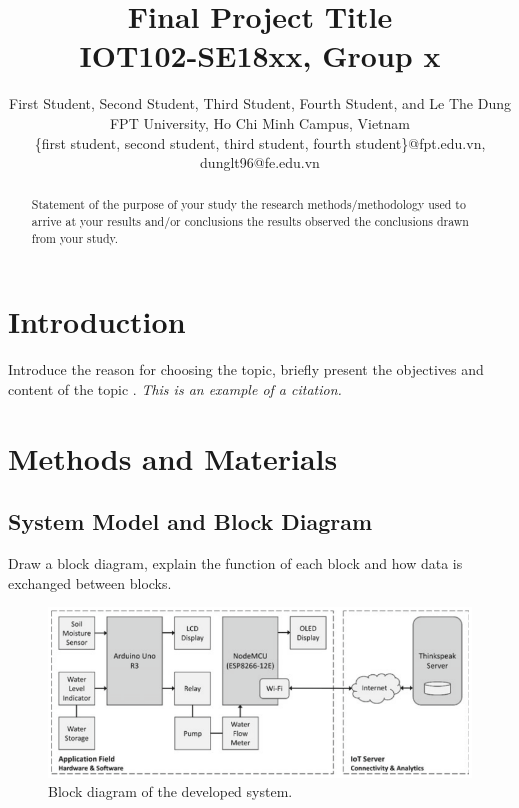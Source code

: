 \documentclass[conference, onecolumn]{IEEEtran}
\begin{document}
\title{Final Project Title\\
{\large IOT102-SE18xx, Group x}}

\author{
First Student, Second Student, Third Student, Fourth Student, and Le The Dung\\
FPT University, Ho Chi Minh Campus, Vietnam\\
\{first student, second student, third student, fourth student\}@fpt.edu.vn, dunglt96@fe.edu.vn}
\maketitle

\begin{abstract}
Statement of the purpose of your study the research methods/methodology used to arrive at your results and/or conclusions the results observed the conclusions drawn from your study.
\end{abstract}

\section{Introduction}
Introduce the reason for choosing the topic, briefly present the objectives and content of the topic \cite{Tellez_2016}. \emph{This is an example of a citation.}

\section{Methods and Materials}

\subsection{System Model and Block Diagram}
Draw a block diagram, explain the function of each block and how data is exchanged between blocks.

\begin{figure}[h]
	\centering
	\includegraphics[scale=2]{Block_diagram.png}
	\caption{Block diagram of the developed system.}
	\label{fig}
\end{figure}
\end{document}
